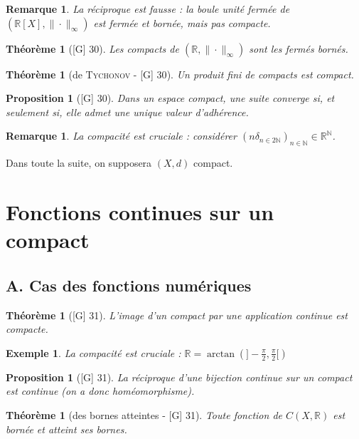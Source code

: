 \documentclass[10pt, a4paper, parskip=full, twoside, twocolumn]{report}
\newtheorem{theorem}[definition]{Théorème}
\newtheorem{proposition}[definition]{Proposition}
\newtheorem{example}[definition]{Exemple}
\newtheorem{remark}[definition]{Remarque}
\newcommand{\IN}{\mathbb{N}}
\newcommand{\IR}{\mathbb{R}}
\begin{document}
\begin{remark}
	La réciproque est fausse : la boule unité fermée de $(\IR[X], \|\cdot\|_{\infty})$ est fermée et bornée, mais pas compacte.
\end{remark}

\begin{theorem}[\textnormal{[G] 30}]
	Les compacts de $(\IR, \|\cdot\|_{\infty})$ sont les fermés bornés.
\end{theorem}

\begin{theorem}[de \textsc{Tychonov} - \textnormal{[G] 30}]
	Un produit fini de compacts est compact.
\end{theorem}

\begin{proposition}[\textnormal{[G] 30}]
	Dans un espace compact, une suite converge si, et seulement si, elle admet une unique valeur d'adhérence.
\end{proposition}

\begin{remark}
	La compacité est cruciale : considérer $\left(n\delta_{n\in 2\IN}\right)_{n\in\IN}\in\IR^{\IN}$.
\end{remark}

\textcolor{paragraphtext}{Dans toute la suite, on supposera $(X,d)$ compact.}
\section*{Fonctions continues sur un compact}
\subsection*{A. Cas des fonctions numériques}

\begin{theorem}[\textnormal{[G] 31}]
	L'image d'un compact par une application continue est compacte.
\end{theorem}

\begin{example}
	La compacité est cruciale : $\IR = \arctan\left(]-\frac{\pi}{2},\frac{\pi}{2}[\right)$
\end{example}

\begin{proposition}[\textnormal{[G] 31}]
	La réciproque d'une bijection continue sur un compact est continue (on a donc homéomorphisme).
\end{proposition}

\begin{theorem}[des bornes atteintes - \textnormal{[G] 31}]
	Toute fonction de $C(X,\IR)$ est bornée et atteint ses bornes.
\end{theorem}
\end{document}
